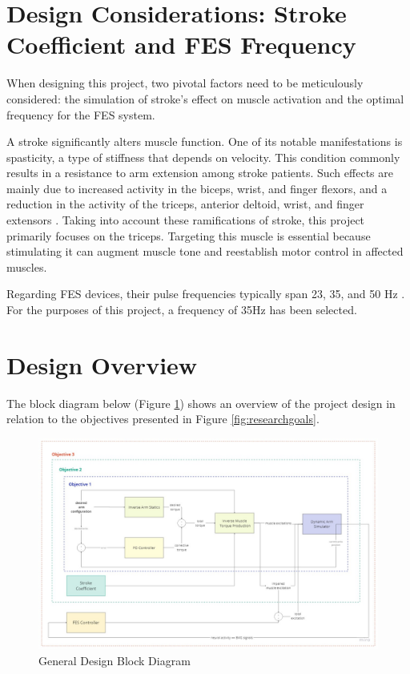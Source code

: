 \section{Design Considerations: Stroke Coefficient and FES Frequency} \label{sec:design considerations}

When designing this project, two pivotal factors need to be meticulously considered: the simulation of stroke's effect on muscle activation and the optimal frequency for the FES system.

A stroke significantly alters muscle function. One of its notable manifestations is spasticity, a type of stiffness that depends on velocity. This condition commonly results in a resistance to arm extension among stroke patients. Such effects are mainly due to increased activity in the biceps, wrist, and finger flexors, and a reduction in the activity of the triceps, anterior deltoid, wrist, and finger extensors \cite{IOL}. Taking into account these ramifications of stroke, this project primarily focuses on the triceps. Targeting this muscle is essential because stimulating it can augment muscle tone and reestablish motor control in affected muscles.

Regarding FES devices, their pulse frequencies typically span 23, 35, and 50 Hz \cite{NNPID}. For the purposes of this project, a frequency of 35Hz has been selected.

\section{Design Overview}
The block diagram below (Figure \ref{fig:bdd}) shows an overview of the project design in relation to the objectives presented in Figure \ref{fig:researchgoals}.

\begin{figure}[h!]
    \centering
    \includegraphics[width=\textwidth]{Pictures/blockDiagram.jpg}
    \caption{General Design Block Diagram}
    \label{fig:bdd}
\end{figure}

